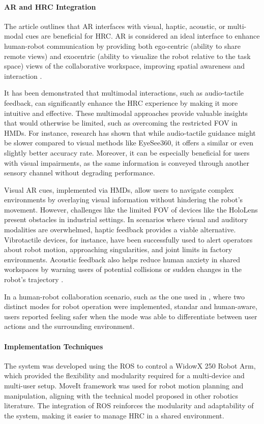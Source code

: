 \begin{enumerate}
    \paragraph{\textbf{\ac{AR} and \ac{HRC} Integration}}
    The article outlines that \ac{AR} interfaces with visual, haptic, acoustic, or multi-modal cues are beneficial for \ac{HRC}. \ac{AR} is considered an ideal interface to enhance human-robot communication by providing both ego-centric (ability to share remote views) and exocentric (ability to visualize the robot relative to the task space) views of the collaborative workspace, improving spatial awareness and interaction \cite{doi:10.5772/5664}. 
    
    It has been demonstrated that multimodal interactions, such as audio-tactile feedback, can significantly enhance the \ac{HRC} experience by making it more intuitive and effective. These multimodal approaches provide valuable insights that would otherwise be limited, such as overcoming the restricted \ac{FOV} in \ac{HMDs}.
    For instance, research has shown that while audio-tactile guidance might be slower compared to visual methods like EyeSee360, it offers a similar or even slightly better accuracy rate. Moreover, it can be especially beneficial for users with visual impairments, as the same information is conveyed through another sensory channel without degrading performance.

    Visual \ac{AR} cues, implemented via \ac{HMDs}, allow users to navigate complex environments by overlaying visual information without hindering the robot’s movement. However, challenges like the limited \ac{FOV} of devices like the HoloLens present obstacles in industrial settings.
    In scenarios where visual and auditory modalities are overwhelmed, haptic feedback provides a viable alternative. Vibrotactile devices, for instance, have been successfully used to alert operators about robot motion, approaching singularities, and joint limits in factory environments. Acoustic feedback also helps reduce human anxiety in shared workspaces by warning users of potential collisions or sudden changes in the robot’s trajectory \cite{9199570}.

    In a human-robot collaboration scenario, such as the one used in \cite{doi:10.1177/0018720814565188}, where two distinct modes for robot operation were implemented, standar and human-aware, users reported feeling safer when the mode was able to differentiate between user actions and the surrounding environment. 

    \paragraph{\textbf{Implementation Techniques}}
    The system was developed using the \ac{ROS} to control a WidowX 250 Robot Arm, which provided the flexibility and modularity required for a multi-device and multi-user setup. MoveIt framework  was used for robot motion planning and manipulation, aligning with the technical model proposed in other robotics literature. The integration of \ac{ROS} reinforces the modularity and adaptability of the system, making it easier to manage \ac{HRC} in a shared environment.


\end{enumerate}
